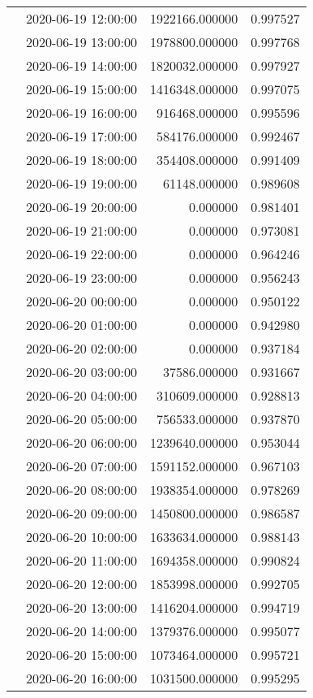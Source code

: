 \begin{tabular}{llrr}
 & 2020-06-19 12:00:00 & 1922166.000000 & 0.997527 \\
 & 2020-06-19 13:00:00 & 1978800.000000 & 0.997768 \\
 & 2020-06-19 14:00:00 & 1820032.000000 & 0.997927 \\
 & 2020-06-19 15:00:00 & 1416348.000000 & 0.997075 \\
 & 2020-06-19 16:00:00 & 916468.000000 & 0.995596 \\
 & 2020-06-19 17:00:00 & 584176.000000 & 0.992467 \\
 & 2020-06-19 18:00:00 & 354408.000000 & 0.991409 \\
 & 2020-06-19 19:00:00 & 61148.000000 & 0.989608 \\
 & 2020-06-19 20:00:00 & 0.000000 & 0.981401 \\
 & 2020-06-19 21:00:00 & 0.000000 & 0.973081 \\
 & 2020-06-19 22:00:00 & 0.000000 & 0.964246 \\
 & 2020-06-19 23:00:00 & 0.000000 & 0.956243 \\
 & 2020-06-20 00:00:00 & 0.000000 & 0.950122 \\
 & 2020-06-20 01:00:00 & 0.000000 & 0.942980 \\
 & 2020-06-20 02:00:00 & 0.000000 & 0.937184 \\
 & 2020-06-20 03:00:00 & 37586.000000 & 0.931667 \\
 & 2020-06-20 04:00:00 & 310609.000000 & 0.928813 \\
 & 2020-06-20 05:00:00 & 756533.000000 & 0.937870 \\
 & 2020-06-20 06:00:00 & 1239640.000000 & 0.953044 \\
 & 2020-06-20 07:00:00 & 1591152.000000 & 0.967103 \\
 & 2020-06-20 08:00:00 & 1938354.000000 & 0.978269 \\
 & 2020-06-20 09:00:00 & 1450800.000000 & 0.986587 \\
 & 2020-06-20 10:00:00 & 1633634.000000 & 0.988143 \\
 & 2020-06-20 11:00:00 & 1694358.000000 & 0.990824 \\
 & 2020-06-20 12:00:00 & 1853998.000000 & 0.992705 \\
 & 2020-06-20 13:00:00 & 1416204.000000 & 0.994719 \\
 & 2020-06-20 14:00:00 & 1379376.000000 & 0.995077 \\
 & 2020-06-20 15:00:00 & 1073464.000000 & 0.995721 \\
 & 2020-06-20 16:00:00 & 1031500.000000 & 0.995295 \\

\end{tabular}
